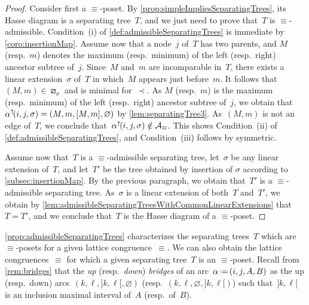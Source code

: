 \documentclass{amsart}
\theoremstyle{definition}
\newcommand{\eqdef}{\mbox{\,\raisebox{0.2ex}{\scriptsize\ensuremath{\mathrm:}}\ensuremath{=}\,}} %
\newcommand{\darkblue}{\color{darkblue}} %
\newcommand{\defn}[1]{\textsl{\darkblue #1}} %
\newcommand{\arc}{\alpha} %
\newcommand{\arcs}{{\mathcal{A}}} %
\newcommand{\arcUp}{\smash{\alpha^{\uparrow\!}}} %
\begin{document}
\begin{proof}
Consider first a $\equiv$-poset.
By \cref{prop:simpleImpliesSeparatingTrees}, its Hasse diagram is a separating tree~$T$, and we just need to prove that~$T$ is $\equiv$-admissible.
Condition~(i) of \cref{def:admissibleSeparatingTrees} is immediate by \cref{coro:insertionMap}.
Assume now that a node~$j$ of~$T$ has two parents, and $M$ (resp.~$m$) denotes the maximum (resp.~minimum) of the left (resp.~right) ancestor subtree of~$j$.
Since~$M$ and~$m$ are incomparable in~$T$, there exists a linear extension~$\sigma$ of~$T$ in which~$M$ appears just before~$m$.
It follows that~$(M,m) \in \boxslash_\sigma$ and is minimal for~$\prec$.
As $M$ (resp.~$m$) is the maximum (resp.~minimum) of the left (resp.~right) ancestor subtree of~$j$, we obtain that~$\arcUp(i, j, \sigma) = (M, m, {[M,m]}, \varnothing)$ by \cref{lem:separatingTree3}.
As~$(M,m)$ is not an edge of~$T$, we conclude that~$\arcUp(i, j, \sigma) \notin \arcs_\equiv$.
This shows Condition~(ii) of \cref{def:admissibleSeparatingTrees}, and Condition~(iii) follows by symmetric.

Assume now that~$T$ is a $\equiv$-admissible separating tree, let~$\sigma$ be any linear extension of~$T$, and let~$T'$ be the tree obtained by insertion of $\sigma$ according to \cref{subsec:insertionMap}.
By the previous paragraph, we obtain that~$T'$ is a $\equiv$-admissible separating tree.
As~$\sigma$ is a linear extension of both~$T$ and~$T'$, we obtain by \cref{lem:admissibleSeparatingTreesWithCommonLinearExtensions} that~$T = T'$, and we conclude that~$T$ is the Hasse diagram of a $\equiv$-poset.
\end{proof}

\cref{prop:admissibleSeparatingTrees} characterizes the separating trees~$T$ which are $\equiv$-posets for a given lattice congruence~$\equiv$.
We can also obtain the lattice congruences~$\equiv$ for which a given separating tree~$T$ is an $\equiv$-poset.
Recall from \cref{rem:bridges} that the  \defn{up} (resp.~\defn{down}) \defn{bridges} of an arc~$\arc \eqdef (i, j, A, B)$ as the up (resp.~down) arcs~$(k, \ell, {]k, \ell[}, \varnothing)$ (resp.~$(k, \ell, \varnothing, {]k, \ell[})$) such that~$]k,\ell[$ is an inclusion maximal interval of~$A$ (resp.~of~$B$).
\end{document}
